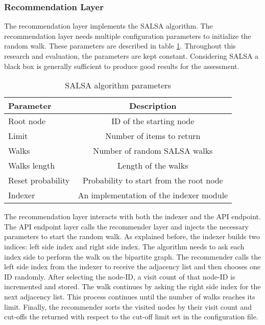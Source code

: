 \subsubsection{Recommendation Layer}
\label{subsubsec:recommendation-layer}
The recommendation layer implements the SALSA \cite{lempelSALSAStochasticApproach2001} algorithm. The recommendation layer needs multiple configuration parameters to initialize the random walk. These parameters are described in table \ref{tab:salsa-parameters}. Throughout this research and evaluation, the parameters are kept constant. Considering SALSA a black box is generally sufficient to produce good results for the assessment.



\begin{table}[!htb]
    \centering
    \caption{SALSA algorithm parameters}
    \label{tab:salsa-parameters}
    \begin{tabular}{|l|c|}
        \hline
        \textbf{Parameter} & \textbf{Description} \\
        \hline
        Root node & ID of the starting node \\
        \hline
        Limit & Number of items to return \\
        \hline
        Walks & Number of random SALSA walks \\
        \hline
        Walks length & Length of the walks \\
        \hline
        Reset probability & Probability to start from the root node \\
        \hline
        Indexer & An implementation of the indexer module \\
        \hline
    \end{tabular}
\end{table}


The recommendation layer interacts with both the indexer and the API endpoint. The API endpoint layer calls the recommender layer and injects the necessary parameters to start the random walk. As explained before, the indexer builds two indices: left side index and right side index. The algorithm needs to ask each index side to perform the walk on the bipartite graph. The recommender calls the left side index from the indexer to receive the adjacency list and then chooses one ID randomly. After selecting the node-ID, a visit count of that node-ID is incremented and stored. The walk continues by asking the right side index for the next adjacency list. This process continues until the number of walks reaches its limit. Finally, the recommender sorts the visited nodes by their visit count and cut-offs the returned with respect to the cut-off limit set in the configuration file.


